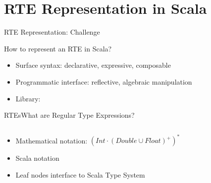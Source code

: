 \section{RTE Representation in Scala}


{  
\begin{frame}{RTE Representation: Challenge }

  How to represent an RTE in Scala?


  \medskip
  
  \begin{itemize}
  \item Surface syntax: declarative, expressive, composable
  \item Programmatic interface: reflective, algebraic manipulation
  \item Library: 
  \end{itemize}
\end{frame}
}

\newsavebox\exnotebox
\begin{lrbox}{\exnotebox}
  \begin{minipage}{6.5cm}
    
  \end{minipage}
\end{lrbox}


\begin{frame}{RTEs}{What are Regular Type Expressions?}
  \begin{columns}
    \begin{column}{0.55\textwidth}
  \begin{itemize}
  \item Mathematical notation: $(Int \cdot (Double \cup Float)^+)^*$
  \item Scala notation\\
    \usebox\exnotebox
  \item Leaf nodes interface to Scala Type System
  \end{itemize}
    \end{column}%
    \begin{column}{0.45\textwidth}
      \scalebox{0.7}{}
    \end{column}%
  \end{columns}%
\end{frame}


\newsavebox\exampleAbox
\begin{lrbox}{\exampleAbox}
  \begin{minipage}{12cm}
    
  \end{minipage}
\end{lrbox}



